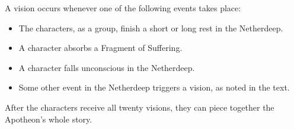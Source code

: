 \documentclass[10pt,a4paper,twoside,bg=print,twocolumn,openany,nodeprecatedcode]{dndbook}
\begin{document}
A vision occurs whenever one of the following events takes place:


\begin{itemize}
\item The characters, as a group, finish a short or long rest in the Netherdeep.
\item A character absorbs a Fragment of Suffering.
\item A character falls unconscious in the Netherdeep.
\item Some other event in the Netherdeep triggers a vision, as noted in the text.
\end{itemize}

After the characters receive all twenty visions, they can piece together the Apotheon's whole story.

{
  \par \vspace { 9pt plus 3pt minus 3pt } \noindent
   \nopagebreak
}
\end{document}
